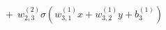 \documentclass[preview]{standalone}
\begin{document}
\begin{align*}
+ \ \ w_{2,3}^{(2)} \sigma(w_{3,1}^{(1)}x + w_{3,2}^{(1)}y +b_3^{(1)})
\end{align*}
\end{document}
